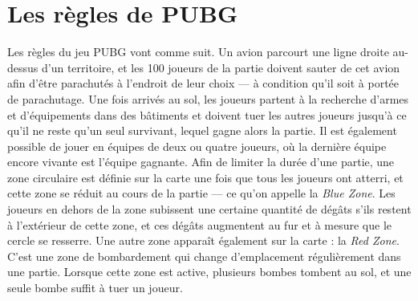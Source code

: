\section{Les règles de PUBG}
\label{sect.pubg}
Les r\`egles du jeu PUBG vont comme suit.
Un avion parcourt une ligne droite au-dessus d'un territoire, et les 100 joueurs de la partie doivent sauter de cet avion afin d'être parachutés à l'endroit de leur choix --- à condition qu'il soit à portée de parachutage. Une fois arrivés au sol, les joueurs partent à la recherche d'armes et d'équipements dans des bâtiments et doivent tuer les autres joueurs jusqu'à ce qu'il ne reste qu'un seul survivant, lequel gagne alors la partie. Il est également possible de jouer en \'equipes de deux ou quatre joueurs, o\`u la dernière équipe encore vivante est l'\'equipe gagnante. Afin de limiter la durée d'une partie, une zone circulaire est définie sur la carte une fois que tous les joueurs ont atterri, et cette zone se réduit au cours de la partie --- ce qu'on appelle la \emph{Blue Zone}. Les joueurs en dehors de la zone subissent une certaine quantité de dégâts s'ils restent \`a l'ext\'erieur de cette zone, et ces dégâts augmentent au fur et à mesure que le cercle se resserre. Une autre zone apparaît également sur la carte : la \emph{Red Zone}. C'est une zone de bombardement qui change d'emplacement régulièrement dans une partie. Lorsque cette zone est active, plusieurs bombes tombent au sol, et une seule bombe suffit à tuer un joueur.
%



